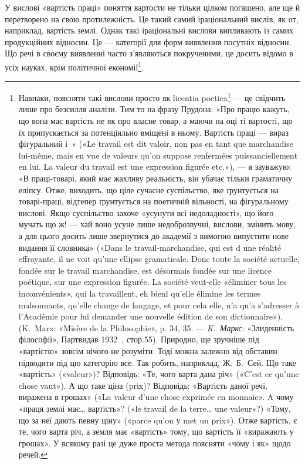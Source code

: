 У вислові «вартість праці» поняття вартости не тільки цілком
погашено, але ще й перетворено на свою протилежність. Це такий
самий іраціональний вислів, як от, наприклад, вартість землі.
Однак такі іраціональні вислови випливають із самих продукційних
відносин. Це — категорії для форм виявлення посутніх
відносин. Що речі в своєму виявленні часто з’являються
покрученими, це досить відомо в усіх науках, крім політичної
економії\footnote{
Навпаки, поясняти такі вислови просто як licentia poetica\footnote*{
поетичні вільності. \emph{Ред.}
} — це свідчить лише про безсилля аналізи. Тим то на фразу Прудона: «Про
працю кажуть, що вона має вартість не як про власне товар, а маючи
на оці ті вартості, що їх припускається за потенціяльно вміщені в ньому.
Вартість праці — вираз фігуральний і~» («Le travail est dit valoir,
non pas en tant que marchandise lui-même, mais en vue de valeurs qu’on
suppose renfermées puissanciellement en lui. La valeur du travail est une
expression figurée etc.»), — я зауважую: «В праці-товарі, який має
жахливу реальність, він убачає тільки граматичну еліпсу. Отже,
виходить, що ціле сучасне суспільство, яке ґрунтується на товарі-праці,
відтепер ґрунтується на поетичній вільності, на фігуральному вислові.
Якщо суспільство захоче «усунути всі недоладності», що його мучать
що ж! — хай воно усуне лише недоброзвучні, вислови, змінить мову, а для
цього досить лише звернутися до академії з вимогою випустити нове
видання її словника» («Dans le travail-marchandise, qui est d une réalité
effrayante, il ne voit qu’une ellipse gramaticale. Donc toute la société actuelle,
fondée sur le travail marchandise, est désormais fondée sur une licence
poétique, sur une expression figurée. La société veut-elle «éliminer tous
les inconvénients», qui la travaillent, eh bienl qu’elle élimine les termes
malsonnants, qu’elle change de langage, et pour cela elle, n’a qu’a s’adresser
à l’Académie pour lui demander une nouvelle édition de son dictionnaire»).
(K.~Marx: «Misère de la Philosophie», p. 34, 35. — \emph{K.~Маркс}: «Злиденність
філософії», Партвидав 1932~, стор.55). Природно, ще зручніше під «вартістю»
зовсім нічого не розуміти. Тоді можна залежно від обставин підводити
під цю категорію все. Так робить, наприклад, Ж.~Б.~Сей. Що
таке «вартість» («valeur»)? Відповідь: «Те, чого варта дана річ» («C’est
ce qu’une chose vaut»). А що таке ціна (prix)? Відповідь: «Вартість даної
речі, виражена в грошах» («La valeur d’une chose exprimée en monnaie».
A чому «праця землі має\dots{} вартість»? («le travail de la terre\dots{} une
valeur»?) «Тому, що за неї дають певну ціну» («parce qu’on у met un
prix»). Отже вартість, є те, чого варта річ, а земля має «вартість» тому,
що вартість її «виражають у грошах». У всякому разі це дуже проста
метода поясняти «чому і як» щодо речей.
}.

